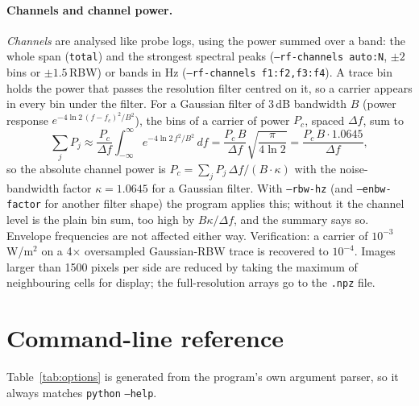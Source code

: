 \documentclass[10pt,letterpaper]{article}
\numberwithin{equation}{section}
\begin{document}
\paragraph{Channels and channel power.} \emph{Channels} are analysed like probe
logs, using the power summed over a band: the whole span (\texttt{total}) and the
strongest spectral peaks (\texttt{--rf-channels auto:N}, $\pm2$ bins or
$\pm1.5$\,RBW) or bands in Hz (\texttt{--rf-channels f1:f2,f3:f4}). A trace bin
holds the power that passes the resolution filter centred on it, so a carrier
appears in every bin under the filter. For a Gaussian filter of 3\,dB bandwidth
$B$ (power response $e^{-4\ln 2\,(f-f_c)^2/B^2}$), the bins of a carrier of power
$P_c$, spaced $\Delta f$, sum to
\begin{equation}
\sum_j P_j \approx \frac{P_c}{\Delta f}\int_{-\infty}^{\infty} e^{-4\ln 2\,f^2/B^2}\,df
 = \frac{P_c\,B}{\Delta f}\sqrt{\frac{\pi}{4\ln 2}} = \frac{P_c\,B\cdot 1.0645}{\Delta f},
\end{equation}
so the absolute channel power is $P_c = \sum_j P_j\,\Delta f/(B\cdot\kappa)$ with the
noise-bandwidth factor $\kappa = 1.0645$ for a Gaussian filter. With
\texttt{--rbw-hz} (and \texttt{--enbw-factor} for another filter shape) the program
applies this; without it the channel level is the plain bin sum, too high by
$B\kappa/\Delta f$, and the summary says so. Envelope frequencies are not
affected either way. Verification: a carrier of $10^{-3}$\,W/m$^2$ on a
4$\times$ oversampled Gaussian-RBW trace is recovered to $10^{-4}$.
Images larger than 1500 pixels per side are reduced by taking the maximum
of neighbouring cells for display; the full-resolution arrays go to the
\texttt{.npz} file.

\section{Command-line reference}\label{sec:cli}
Table~\ref{tab:options} is generated from the program's own argument parser,
so it always matches \texttt{python}  \texttt{--help}.
\end{document}
